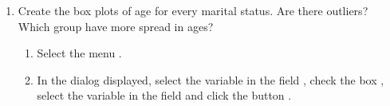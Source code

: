 \begin{enumerate}[leftmargin=*]
\begin{enumerate}
\item Create the box plots of age for every marital status. Are there outliers? Which group have more spread in ages?
\begin{indication}
\begin{enumerate}
\item Select the menu .
\item In the dialog displayed, select the variable  in the field ,
check the box , select the variable  in the field
 and click the button .
\end{enumerate}
\end{indication}
\end{enumerate}

\end{enumerate}



